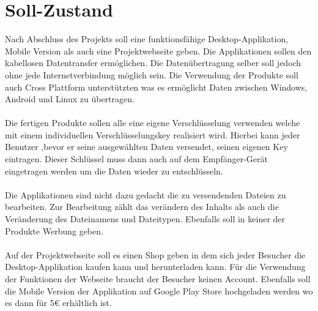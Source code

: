 \section{Soll-Zustand}
Nach Abschluss des Projekts soll eine funktionsfähige Desktop-Applikation, Mobile Version als auch eine Projektwebseite geben. Die Applikationen sollen den kabellosen Datentransfer ermöglichen. Die Datenübertragung selber soll jedoch ohne jede Internetverbindung möglich sein. Die Verwendung der Produkte soll auch Cross Plattform unterstützten was es ermöglicht Daten zwischen Windows, Android und Linux zu übertragen.
\\\\
Die fertigen Produkte sollen alle eine eigene Verschlüsselung verwenden welche mit einem individuellen Verschlüsselungskey realisiert wird. Hierbei kann jeder Benutzer ,bevor er seine ausgewählten Daten versendet, seinen eigenen Key eintragen. Dieser Schlüssel muss dann auch auf dem Empfänger-Gerät eingetragen werden um die Daten wieder zu entschlüsseln.
\\\\
Die Applikationen sind nicht dazu gedacht die zu versendenden Dateien zu bearbeiten. Zur Bearbeitung zählt das verändern des Inhalts als auch die Veränderung des Dateinamens und Dateitypen. Ebenfalls soll in keiner der Produkte Werbung geben.
\\\\
Auf der Projektwebseite soll es einen Shop geben in dem sich jeder Besucher die Desktop-Applikation kaufen kann und herunterladen kann. Für die Verwendung der Funktionen der Webseite braucht der Besucher keinen Account. Ebenfalls soll die Mobile Version der Applikation auf Google Play Store hochgeladen werden wo es dann für 5€ erhältlich ist.